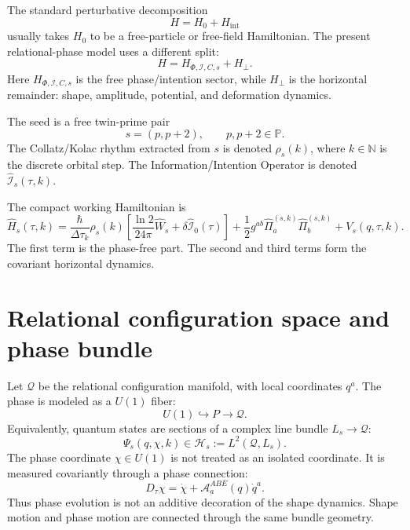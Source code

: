 \documentclass[11pt,a4paper]{article}
\newcommand{\Q}{\mathcal Q}
\newcommand{\Hh}{\mathcal H}
\newcommand{\Abe}{\mathcal A^{ABE}}
\newcommand{\Iop}{\hat{\mathcal I}}
\newcommand{\Wop}{\hat W}
\newcommand{\Hs}{\hat H_s}
\begin{document}
The standard perturbative decomposition
\begin{equation}
  H = H_0 + H_{\mathrm{int}}
\end{equation}
usually takes $H_0$ to be a free-particle or free-field Hamiltonian. The present relational-phase model uses a different split:
\begin{equation}
  \boxed{H = H_{\Phi,\mathcal I,C,s} + H_{\perp}.}
  \label{eq:main_split}
\end{equation}
Here $H_{\Phi,\mathcal I,C,s}$ is the free phase/intention sector, while $H_{\perp}$ is the horizontal remainder: shape, amplitude, potential, and deformation dynamics.

The seed is a free twin-prime pair
\begin{equation}
  \boxed{s=(p,p+2),\qquad p,p+2\in \mathbb P.}
\end{equation}
The Collatz/Kolac rhythm extracted from $s$ is denoted $\rho_s(k)$, where $k\in\mathbb N$ is the discrete orbital step. The Information/Intention Operator is denoted $\Iop_s(\tau,k)$.

The compact working Hamiltonian is
\begin{equation}
\boxed{
\Hs(\tau,k)
=
\frac{\hbar}{\Delta\tau_k}\rho_s(k)
\left[\frac{\ln2}{24\pi}\Wop_s+\delta\Iop_0(\tau)\right]
+
\frac12 g^{ab}\hat\Pi_a^{(s,k)}\hat\Pi_b^{(s,k)}
+V_s(q,\tau,k).}
\label{eq:compact_hamiltonian}
\end{equation}
The first term is the phase-free part. The second and third terms form the covariant horizontal dynamics.

\section{Relational configuration space and phase bundle}

Let $\Q$ be the relational configuration manifold, with local coordinates $q^a$. The phase is modeled as a $U(1)$ fiber:
\begin{equation}
  U(1)\hookrightarrow P\rightarrow \Q.
\end{equation}
Equivalently, quantum states are sections of a complex line bundle $L_s\to \Q$:
\begin{equation}
  \Psi_s(q,\chi,k)\in \Hh_s:=L^2(\Q,L_s).
\end{equation}
The phase coordinate $\chi\in U(1)$ is not treated as an isolated coordinate. It is measured covariantly through a phase connection:
\begin{equation}
  D_\tau\chi=\dot\chi+\Abe_a(q)\dot q^a.
  \label{eq:cov_phase_derivative}
\end{equation}
Thus phase evolution is not an additive decoration of the shape dynamics. Shape motion and phase motion are connected through the same bundle geometry.
\end{document}
